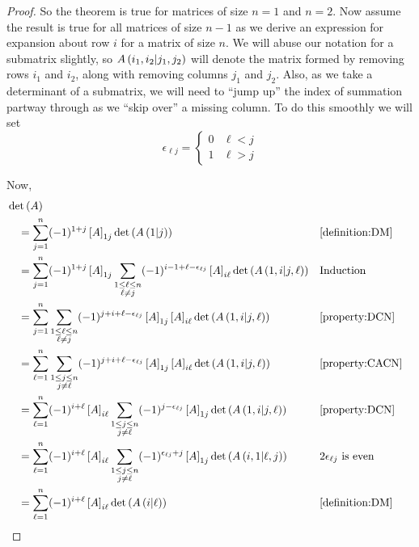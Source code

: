 \documentclass{ximera}
\begin{document}
\begin{theorem}
\begin{proof}
  So the theorem is true for matrices of size $n=1$ and $n=2$.  Now
  assume the result is true for all matrices of size $n-1$ as we
  derive an expression for expansion about row $i$ for a matrix of
  size $n$.  We will abuse our notation for a submatrix slightly, so
  $A\left(i_1,i_2|j_1,j_2\right)$ will denote the matrix formed by
  removing rows $i_1$ and $i_2$, along with removing columns $j_1$ and
  $j_2$.  Also, as we take a determinant of a submatrix, we will need
  to ``jump up'' the index of summation partway through as we ``skip
  over'' a missing column.  To do this smoothly we will set
  \[
    \epsilon_{\ell j}=
    \begin{cases}
      0 & \ell<j\\
      1 & \ell>j
    \end{cases}
  \]

  Now,
  \begin{align*}
    &\det\left(A\right)\\
&\quad=
  \sum_{j=1}^{n}(-1)^{1+j}\left\lbrack A\right\rbrack_{1j}\det\left(A\left(1|j\right)\right)
&&\ref{definition:DM}\\
    &\quad=
      \sum_{j=1}^{n}(-1)^{1+j}\left\lbrack A\right\rbrack_{1j}
      \sum_{\substack{1\leq\ell\leq n\\\ell\neq j}}
    (-1)^{i-1+\ell-\epsilon_{\ell j}}\left\lbrack A\right\rbrack_{i\ell}\det\left(A\left(1,i|j,\ell\right)\right)
    &&\text{Induction}\\
    &\quad=
      \sum_{j=1}^{n}\sum_{\substack{1\leq\ell\leq n\\\ell\neq j}}
    (-1)^{j+i+\ell-\epsilon_{\ell j}}
\left\lbrack A\right\rbrack_{1j}\left\lbrack A\right\rbrack_{i\ell}\det\left(A\left(1,i|j,\ell\right)\right)
    &&\ref{property:DCN}\\
    &\quad=
      \sum_{\ell=1}^{n}\sum_{\substack{1\leq j\leq n\\j\neq\ell}}
    (-1)^{j+i+\ell-\epsilon_{\ell j}}
    \left\lbrack A\right\rbrack_{1j}\left\lbrack A\right\rbrack_{i\ell}\det\left(A\left(1,i|j,\ell\right)\right)
&&\ref{property:CACN}\\
    &\quad=
      \sum_{\ell=1}^{n}(-1)^{i+\ell}\left\lbrack A\right\rbrack_{i\ell}
      \sum_{\substack{1\leq j\leq n\\j\neq\ell}}
    (-1)^{j-\epsilon_{\ell j}}
    \left\lbrack A\right\rbrack_{1j}\det\left(A\left(1,i|j,\ell\right)\right)
    &&\ref{property:DCN}\\
    &\quad=
      \sum_{\ell=1}^{n}(-1)^{i+\ell}\left\lbrack A\right\rbrack_{i\ell}
      \sum_{\substack{1\leq j\leq n\\j\neq\ell}}
    (-1)^{\epsilon_{\ell j}+j}
    \left\lbrack A\right\rbrack_{1j}\det\left(A\left(i,1|\ell,j\right)\right)
    &&\text{$2\epsilon_{\ell j}$ is even}\\
    &\quad=
      \sum_{\ell=1}^{n}(-1)^{i+\ell}\left\lbrack A\right\rbrack_{i\ell}\det\left(A\left(i|\ell\right)\right)
&&\ref{definition:DM}
  \end{align*}

\end{proof}
\end{theorem}
\end{document}
